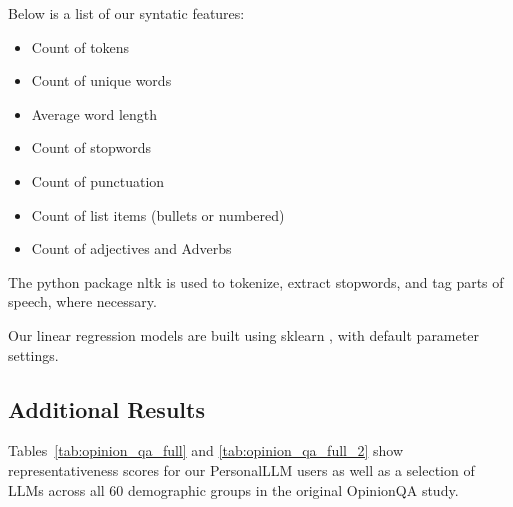 Below is a list of our syntatic features:
\begin{itemize}
    \item Count of tokens
    \item Count of unique words
    \item Average word length
    \item Count of stopwords
    \item Count of punctuation
    \item Count of list items (bullets or numbered)
    \item Count of adjectives and Adverbs
\end{itemize}
The python package nltk \citep{bird-loper-2004-nltk} is used to tokenize, extract stopwords, and tag parts of speech, where necessary.

Our linear regression models are built using sklearn \citep{scikit-learn}, with default parameter settings.

\subsection{Additional Results}\label{app:user_results}

Tables~\ref{tab:opinion_qa_full} and \ref{tab:opinion_qa_full_2} show representativeness scores for our PersonalLLM users as well as a selection of LLMs across all 60 demographic groups in the original OpinionQA \citep{santurkar2023opinions} study.

